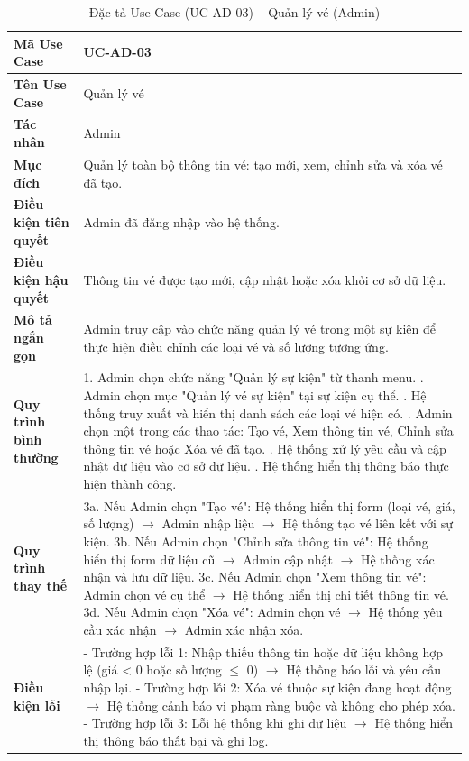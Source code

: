 \renewcommand{\arraystretch}{1.3}
\setlength{\tabcolsep}{4pt}
\begin{longtable}{|p{}|p{}|}
\caption{Đặc tả Use Case (UC-AD-03) -- Quản lý vé (Admin)}\label{tab:uc_manage_tickets}\\
\hline
\textbf{Mã Use Case} & UC-AD-03 \\ \hline
\textbf{Tên Use Case} & Quản lý vé \\ \hline
\textbf{Tác nhân} & Admin \\ \hline
\textbf{Mục đích} & Quản lý toàn bộ thông tin vé: tạo mới, xem, chỉnh sửa và xóa vé đã tạo. \\ \hline
\textbf{Điều kiện tiên quyết} & Admin đã đăng nhập vào hệ thống. \\ \hline
\textbf{Điều kiện hậu quyết} & Thông tin vé được tạo mới, cập nhật hoặc xóa khỏi cơ sở dữ liệu. \\ \hline
\textbf{Mô tả ngắn gọn} & Admin truy cập vào chức năng quản lý vé trong một sự kiện để thực hiện điều chỉnh các loại vé và số lượng tương ứng. \\ \hline
\textbf{Quy trình bình thường} &
1. Admin chọn chức năng "Quản lý sự kiện" từ thanh menu. \newline
2. Admin chọn mục "Quản lý vé sự kiện" tại sự kiện cụ thể. \newline
3. Hệ thống truy xuất và hiển thị danh sách các loại vé hiện có. \newline
4. Admin chọn một trong các thao tác: Tạo vé, Xem thông tin vé, Chỉnh sửa thông tin vé hoặc Xóa vé đã tạo. \newline
5. Hệ thống xử lý yêu cầu và cập nhật dữ liệu vào cơ sở dữ liệu. \newline
6. Hệ thống hiển thị thông báo thực hiện thành công. \\ \hline
\textbf{Quy trình thay thế} &
3a. Nếu Admin chọn "Tạo vé": Hệ thống hiển thị form (loại vé, giá, số lượng) $\rightarrow$ Admin nhập liệu $\rightarrow$ Hệ thống tạo vé liên kết với sự kiện. \newline
3b. Nếu Admin chọn "Chỉnh sửa thông tin vé": Hệ thống hiển thị form dữ liệu cũ $\rightarrow$ Admin cập nhật $\rightarrow$ Hệ thống xác nhận và lưu dữ liệu. \newline
3c. Nếu Admin chọn "Xem thông tin vé": Admin chọn vé cụ thể $\rightarrow$ Hệ thống hiển thị chi tiết thông tin vé. \newline
3d. Nếu Admin chọn "Xóa vé": Admin chọn vé $\rightarrow$ Hệ thống yêu cầu xác nhận $\rightarrow$ Admin xác nhận xóa. \\ \hline
\textbf{Điều kiện lỗi} &
- Trường hợp lỗi 1: Nhập thiếu thông tin hoặc dữ liệu không hợp lệ (giá < 0 hoặc số lượng $\le$ 0) $\rightarrow$ Hệ thống báo lỗi và yêu cầu nhập lại. \newline
- Trường hợp lỗi 2: Xóa vé thuộc sự kiện đang hoạt động $\rightarrow$ Hệ thống cảnh báo vi phạm ràng buộc và không cho phép xóa. \newline
- Trường hợp lỗi 3: Lỗi hệ thống khi ghi dữ liệu $\rightarrow$ Hệ thống hiển thị thông báo thất bại và ghi log. \\ \hline
\end{longtable}

